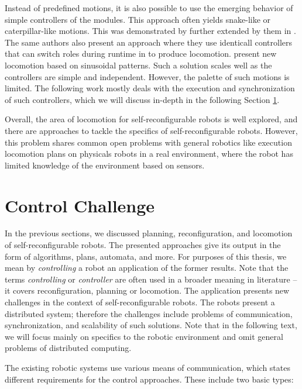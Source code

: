 Instead of predefined motions, it is also possible to use the emerging behavior
of simple controllers of the modules. This approach often yields snake-like or
caterpillar-like motions. This was demonstrated by \textcite{stoy2002global}
further extended by them in \cite{DBLP:conf/icra/StoySW03}. The same authors
also present an approach where they use identicall controllers that can switch
roles during runtime in \cite{1159219} to produce locomotion.
\textcite{gonzalez2006locomotion} present new locomotion based on sinusoidal
patterns. Such a solution scales well as the controllers are simple and
independent. However, the palette of such motions is limited. The following work
mostly deals with the execution and synchronization of such controllers, which
we will discuss in-depth in the following Section \ref{sec:chal-control}.

Overall, the area of locomotion for self-reconfigurable robots is well explored,
and there are approaches to tackle the specifics of self-reconfigurable robots.
However, this problem shares common open problems with general robotics like
execution locomotion plans on physicals robots in a real environment, where the
robot has limited knowledge of the environment based on sensors.

\section{Control Challenge}\label{sec:chal-control}

In the previous sections, we discussed planning, reconfiguration, and locomotion
of self-reconfigurable robots. The presented approaches give its output in the
form of algorithms, plans, automata, and more. For purposes of this thesis, we
mean by \emph{controlling} a robot an application of the former results. Note
that the terms \emph{controlling} or \emph{controller} are often used in a
broader meaning in literature -- it covers reconfiguration, planning or
locomotion. The application presents new challenges in the context of
self-reconfigurable robots. The robots present a distributed system; therefore
the challenges include problems of communication, synchronization, and
scalability of such solutions. Note that in the following text, we will focus
mainly on specifics to the robotic environment and omit general problems of
distributed computing.

The existing robotic systems use various means of communication, which states
different requirements for the control approaches. These include two basic
types:

